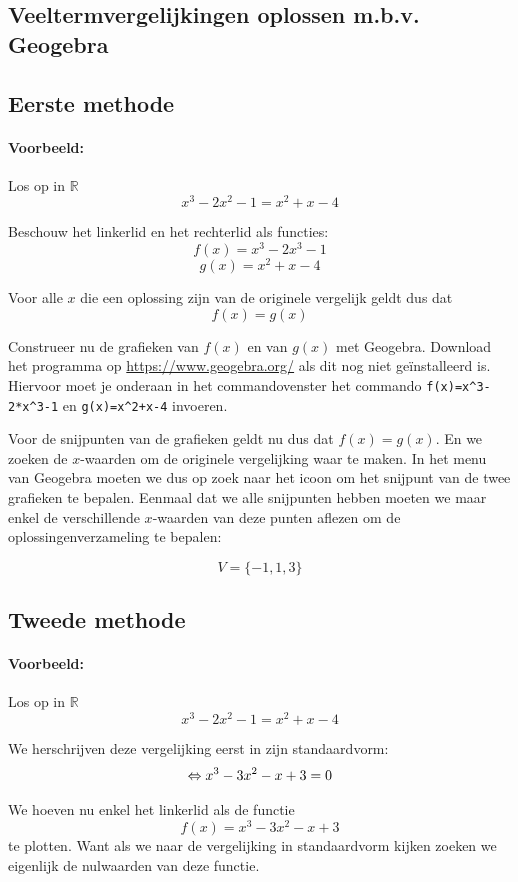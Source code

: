 \documentclass[12pt]{article}
\begin{document}
\subsection{Veeltermvergelijkingen oplossen m.b.v. Geogebra}

\subsection*{Eerste methode}

\paragraph*{Voorbeeld:} Los op in $\mathbb{R}$
$$x^3-2x^2-1=x^2+x-4$$

Beschouw het linkerlid en het rechterlid als functies:
$$f(x)=x^3-2x^3-1$$
$$g(x)=x^2+x-4$$

Voor alle $x$ die een oplossing zijn van de originele vergelijk geldt dus dat
$$f(x)=g(x)$$

Construeer nu de grafieken van $f(x)$ en van $g(x)$ met Geogebra. Download het programma op \url{https://www.geogebra.org/} als dit nog niet geïnstalleerd is. Hiervoor moet je onderaan in het commandovenster het commando \verb#f(x)=x^3-2*x^3-1# en \verb#g(x)=x^2+x-4# invoeren.

Voor de snijpunten van de grafieken geldt nu dus dat $f(x)=g(x)$. En we zoeken de $x$-waarden om de originele vergelijking waar te maken. In het menu van Geogebra moeten we dus op zoek naar het icoon om het snijpunt van de twee grafieken te bepalen. Eenmaal dat we alle snijpunten hebben moeten we maar enkel de verschillende $x$-waarden van deze punten aflezen om de oplossingenverzameling te bepalen:

$$V=\{-1, 1, 3\}$$

\subsection*{Tweede methode}

\paragraph*{Voorbeeld:} Los op in $\mathbb{R}$
$$x^3-2x^2-1=x^2+x-4$$

We herschrijven deze vergelijking eerst in zijn standaardvorm:
$$\Leftrightarrow x^3-3x^2-x + 3=0$$

We hoeven nu enkel het linkerlid als de functie
$$f(x)=x^3-3x^2-x + 3$$
te plotten. Want als we naar de vergelijking in standaardvorm kijken zoeken we eigenlijk de nulwaarden van deze functie.
\end{document}
